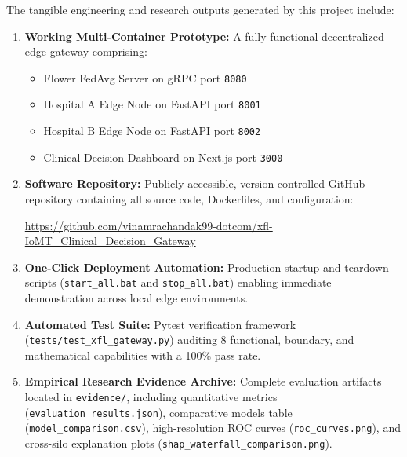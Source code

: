 \documentclass[12pt,a4paper,oneside]{report}
\begin{document}
The tangible engineering and research outputs generated by this project include:

\begin{enumerate}
    \item \textbf{Working Multi-Container Prototype:} A fully functional decentralized edge gateway comprising:
    \begin{itemize}
        \item Flower FedAvg Server on gRPC port \texttt{8080}
        \item Hospital A Edge Node on FastAPI port \texttt{8001}
        \item Hospital B Edge Node on FastAPI port \texttt{8002}
        \item Clinical Decision Dashboard on Next.js port \texttt{3000}
    \end{itemize}
    \item \textbf{Software Repository:} Publicly accessible, version-controlled GitHub repository containing all source code, Dockerfiles, and configuration:
    \begin{center}
        \url{https://github.com/vinamrachandak99-dotcom/xfl-IoMT_Clinical_Decision_Gateway}
    \end{center}
    \item \textbf{One-Click Deployment Automation:} Production startup and teardown scripts (\texttt{start\_all.bat} and \texttt{stop\_all.bat}) enabling immediate demonstration across local edge environments.
    \item \textbf{Automated Test Suite:} Pytest verification framework (\texttt{tests/test\_xfl\_gateway.py}) auditing 8 functional, boundary, and mathematical capabilities with a 100\% pass rate.
    \item \textbf{Empirical Research Evidence Archive:} Complete evaluation artifacts located in \texttt{evidence/}, including quantitative metrics (\texttt{evaluation\_results.json}), comparative models table (\texttt{model\_comparison.csv}), high-resolution ROC curves (\texttt{roc\_curves.png}), and cross-silo explanation plots (\texttt{shap\_waterfall\_comparison.png}).
\end{enumerate}
\end{document}
